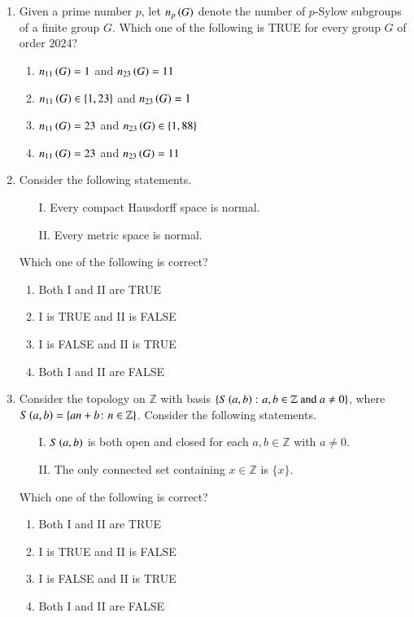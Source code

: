 \documentclass[journal,12pt,onecolumn]{IEEEtran}
\theoremstyle{remark}
\begin{document}
\begin{enumerate}
\item Given a prime number $p$, let $n_p\left(G\right)$ denote the number of $p$-Sylow subgroups of a finite group $G$. Which one of the following is TRUE for every group $G$ of order $2024$? \hfill{}
\begin{enumerate}
    \item $n_{11}\left(G\right) = 1$ and $n_{23}\left(G\right) = 11$
    \item $n_{11}\left(G\right) \in \{1, 23\}$ and $n_{23}\left(G\right) = 1$
    \item $n_{11}\left(G\right) = 23$ and $n_{23}\left(G\right) \in \{1, 88\}$
    \item $n_{11}\left(G\right) = 23$ and $n_{23}\left(G\right) = 11$
\end{enumerate}

\item Consider the following statements.
\begin{enumerate}
    \item[I.] Every compact Hausdorff space is normal.
    \item[II.] Every metric space is normal.
\end{enumerate}
Which one of the following is correct? \hfill{}
\begin{enumerate}
    \item Both I and II are TRUE
    \item I is TRUE and II is FALSE
    \item I is FALSE and II is TRUE
    \item Both I and II are FALSE
\end{enumerate}

\item Consider the topology on $\mathbb{Z}$ with basis $\{S\left(a, b\right) \colon a, b \in \mathbb{Z} \text{ and } a \neq 0\}$, where $S\left(a, b\right) = \{an + b \colon n \in \mathbb{Z}\}$. Consider the following statements.
\begin{enumerate}
    \item[I.] $S\left(a, b\right)$ is both open and closed for each $a, b \in \mathbb{Z}$ with $a \neq 0$.
    \item[II.] The only connected set containing $x \in \mathbb{Z}$ is $\{x\}$.
\end{enumerate}
Which one of the following is correct? \hfill{}
\begin{enumerate}
    \item Both I and II are TRUE
    \item I is TRUE and II is FALSE
    \item I is FALSE and II is TRUE
    \item Both I and II are FALSE
\end{enumerate}


\end{enumerate}
\end{document}
